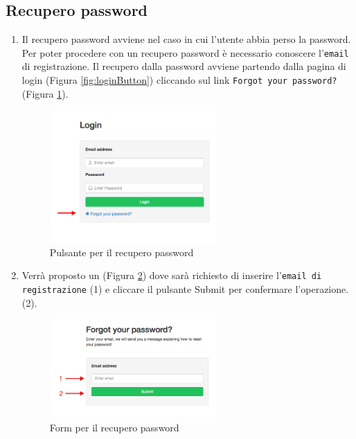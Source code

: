 	\subsection{Recupero password}
		\label{recuperopassword}
		\begin{enumerate}

			\item Il recupero password avviene nel caso in cui l'utente abbia perso la password. Per poter procedere con un recupero password è necessario conoscere l'\texttt{email} di registrazione. Il recupero dalla password avviene partendo dalla pagina di login (Figura \ref{fig:loginButton}) cliccando sul link \texttt{Forgot your password?} (Figura \ref{fig:forgotpwd}).

			\begin{figure}[H]
				\centering \includegraphics[width=0.6\textwidth]{img/forgotpwd.png}
			\caption{ \label{fig:forgotpwd} Pulsante per il recupero password}
			\end{figure}

			\item Verrà proposto un  (Figura \ref{fig:forgotPwdForm}) dove sarà richiesto di inserire l'\texttt{email di registrazione} (1) e cliccare il pulsante Submit per confermare l'operazione. (2).

			\begin{figure}[H]
				\centering \includegraphics[width=0.6\textwidth]{img/forgotPwdForm.png}
			\caption{ \label{fig:forgotPwdForm} Form per il recupero password}
			\end{figure}


\end{enumerate}
